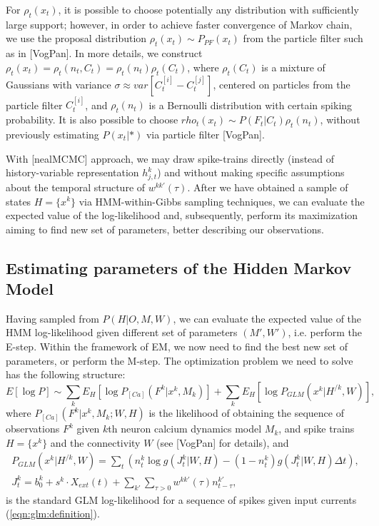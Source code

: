 \documentclass[amsmath,amssymb]{revtex4}
\begin{document}
For $\rho_t(x_t)$, it is possible to choose potentially any distribution with sufficiently large support; however, in order to achieve faster convergence of Markov chain, we use the proposal distribution $\rho_t(x_t) \sim P_{PF}(x_t)$ from the particle filter such as in [VogPan]. In more details, we construct $\rho_t(x_t)=\rho_t(n_t,C_t)=\rho_t(n_t)\rho_t(C_t)$, where $\rho_t(C_t)$ is a mixture of Gaussians with variance $\sigma \approx var\left[C^{[i]}_t-C^{[j]}_t\right]$, centered on particles from the particle filter $C^{[i]}_t$, and $\rho_t(n_t)$ is a Bernoulli distribution with certain spiking probability. It is also possible to choose $rho_t(x_t)\sim P(F_t|C_t)\rho_t(n_t)$, without previously estimating $P(x_t|*)$ via particle filter [VogPan].

With [nealMCMC] approach, we may draw spike-trains directly (instead of history-variable representation $h^k_{j,t}$) and without making specific assumptions about the temporal structure of $w^{kk'}(\tau)$. After we have obtained a sample of states $H=\{x^k\}$ via HMM-within-Gibbs sampling techniques, we can evaluate the expected value of the log-likelihood and, subsequently, perform its maximization aiming to find new set of parameters, better describing our observations.

\subsection{\label{sec:methods:sampling HMM}Estimating parameters of the Hidden Markov Model}
Having sampled from $P(H|O,M,W)$, we can evaluate the expected value of the HMM log-likelihood given different set of parameters $(M', W')$, i.e. perform the E-step. Within the framework of EM, we now need to find the best new set of parameters, or perform the M-step. The optimization problem we need to solve has the following structure:
\begin{equation}\label{eqn:loglik:definition}
E[\log P]\sim \sum_k E_{H}[\log P_{[Ca]}(F^k|x^k,M_k)] + \sum_k E_H[\log P_{GLM}(x^k|H^{/k},W)],
\end{equation}
where $P_{[Ca]}(F^k|x^k,M_k;W,H)$ is the likelihood of obtaining the sequence of observations
$F^k$ given $k$th neuron calcium dynamics model $M_k$, and spike trains $H=\{x^k\}$ and the connectivity $W$ (see [VogPan] for details), and
\begin{equation}
\begin{array}{l}
P_{GLM}(x^k|H^{/k},W)=\sum_t \left( n^k_t \log g(J^k_t|W,H) - (1-n^k_t) g(J^k_t|W,H) \Delta t \right),\\
J^k_t=b_0^k+s^k\cdot X_{ext}(t)+\sum\limits_{k'} \sum\limits_{\tau>0} w^{kk'}(\tau)n^{k'}_{t-\tau},
\end{array}
\end{equation}
is the standard GLM log-likelihood for a sequence of spikes given input currents (\ref{eqn:glm:definition}).
\end{document}
